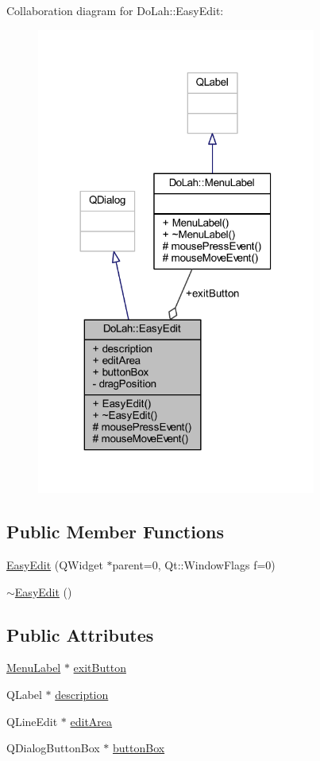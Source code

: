 Collaboration diagram for Do\+Lah\+:\+:Easy\+Edit\+:
\nopagebreak
\begin{figure}[H]
\begin{center}
\leavevmode
\includegraphics[width=260pt]{class_do_lah_1_1_easy_edit__coll__graph}
\end{center}
\end{figure}
\subsection*{Public Member Functions}
\begin{DoxyCompactItemize}
\item 
\hyperlink{class_do_lah_1_1_easy_edit_a777d72ce5324f98f54f366824ba6782d}{Easy\+Edit} (Q\+Widget $\ast$parent=0, Qt\+::\+Window\+Flags f=0)
\item 
\hyperlink{class_do_lah_1_1_easy_edit_ae8a566c31ba89570b99be2f0e6d6d4d9}{$\sim$\+Easy\+Edit} ()
\end{DoxyCompactItemize}
\subsection*{Public Attributes}
\begin{DoxyCompactItemize}
\item 
\hyperlink{class_do_lah_1_1_menu_label}{Menu\+Label} $\ast$ \hyperlink{class_do_lah_1_1_easy_edit_ae92382bcf128f607904cc76dcdca07fa}{exit\+Button}
\item 
Q\+Label $\ast$ \hyperlink{class_do_lah_1_1_easy_edit_ace3761bbfc57c6f2a01ba479c444a43d}{description}
\item 
Q\+Line\+Edit $\ast$ \hyperlink{class_do_lah_1_1_easy_edit_af0fcb4b23998a319e187da309748e319}{edit\+Area}
\item 
Q\+Dialog\+Button\+Box $\ast$ \hyperlink{class_do_lah_1_1_easy_edit_a1e4ffe1820e49d246fdb8e7e96c72ef5}{button\+Box}
\end{DoxyCompactItemize}
